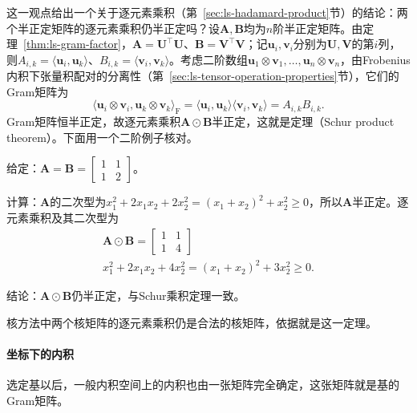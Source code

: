 这一观点给出一个关于逐元素乘积（第~\ref{sec:ls-hadamard-product}节）的结论：两个半正定矩阵的逐元素乘积仍半正定吗？设$\bm A,\bm B$均为$n$阶半正定矩阵。由定理~\ref{thm:ls-gram-factor}，$\bm A=\bm U^\top\bm U$、$\bm B=\bm V^\top\bm V$；记$\bm u_i,\bm v_i$分别为$\bm U,\bm V$的第$i$列，则$A_{i,k}=\langle\bm u_i,\bm u_k\rangle$、$B_{i,k}=\langle\bm v_i,\bm v_k\rangle$。考虑二阶数组$\bm u_1\otimes\bm v_1,\ldots,\bm u_n\otimes\bm v_n$，由Frobenius内积下张量积配对的分离性（第~\ref{sec:ls-tensor-operation-properties}节），它们的Gram矩阵为
\[
 \langle\bm u_i\otimes\bm v_i,\bm u_k\otimes\bm v_k\rangle_{\mathrm F}
 =\langle\bm u_i,\bm u_k\rangle\langle\bm v_i,\bm v_k\rangle
 =A_{i,k}B_{i,k}.
\]
Gram矩阵恒半正定，故逐元素乘积$\bm A\odot\bm B$半正定，这就是定理（Schur product theorem）。下面用一个二阶例子核对。
\begin{example}[两个半正定矩阵的逐元素乘积]
\label{ex:ls-schur-product}
给定：$\bm A=\bm B=\left[\begin{smallmatrix}1&1\\1&2\end{smallmatrix}\right]$。

计算：$\bm A$的二次型为$x_1^2+2x_1x_2+2x_2^2=(x_1+x_2)^2+x_2^2\geq0$，所以$\bm A$半正定。逐元素乘积及其二次型为
\[
\begin{gathered}
\bm A\odot\bm B=\begin{bmatrix}1&1\\1&4\end{bmatrix}\\
x_1^2+2x_1x_2+4x_2^2=(x_1+x_2)^2+3x_2^2\geq0 .
\end{gathered}
\]

结论：$\bm A\odot\bm B$仍半正定，与Schur乘积定理一致。
\end{example}
核方法中两个核矩阵的逐元素乘积仍是合法的核矩阵，依据就是这一定理。

\paragraph{坐标下的内积}
选定基以后，一般内积空间上的内积也由一张矩阵完全确定，这张矩阵就是基的Gram矩阵。


